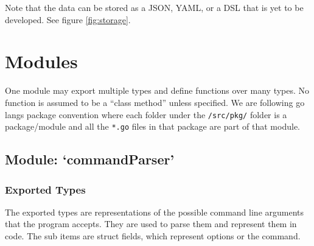 \documentclass[11pt]{article}
\begin{document}
Note that the data can be stored as a JSON, YAML, or a DSL that is yet to be
developed. See figure \ref{fig:storage}.


\newpage
\section{Modules}
\label{sec:modules}

One module may export multiple types and
define functions over many types. No function is assumed to be a ``class method''
unless specified. We are following go langs package convention where each folder under the \texttt{/src/pkg/} folder is a package/module
and all the \texttt{*.go} files in that package are part of that module.

\subsection{Module: `commandParser'}
\label{mod:command}

\subsubsection{Exported Types}

The exported types are representations of the possible command line arguments
that the program accepts. They are used to parse them and represent them in
code. The sub items are struct fields, which represent options or the command.
\end{document}
